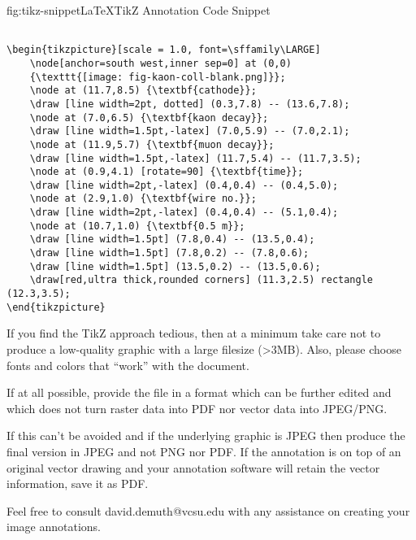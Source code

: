 \begin{dunefigure}{fig:tikz-snippet}{\LaTeX TikZ Annotation Code Snippet}
\begin{framed}
\begin{verbatim}

\begin{tikzpicture}[scale = 1.0, font=\sffamily\LARGE]
    \node[anchor=south west,inner sep=0] at (0,0) 
    {\texttt{[image: fig-kaon-coll-blank.png]}};
    \node at (11.7,8.5) {\textbf{cathode}};    
    \draw [line width=2pt, dotted] (0.3,7.8) -- (13.6,7.8);
    \node at (7.0,6.5) {\textbf{kaon decay}};    
    \draw [line width=1.5pt,-latex] (7.0,5.9) -- (7.0,2.1);
    \node at (11.9,5.7) {\textbf{muon decay}};    
    \draw [line width=1.5pt,-latex] (11.7,5.4) -- (11.7,3.5);
    \node at (0.9,4.1) [rotate=90] {\textbf{time}};
    \draw [line width=2pt,-latex] (0.4,0.4) -- (0.4,5.0);
    \node at (2.9,1.0) {\textbf{wire no.}};   
    \draw [line width=2pt,-latex] (0.4,0.4) -- (5.1,0.4);
    \node at (10.7,1.0) {\textbf{0.5 m}};    
    \draw [line width=1.5pt] (7.8,0.4) -- (13.5,0.4);
    \draw [line width=1.5pt] (7.8,0.2) -- (7.8,0.6);
    \draw [line width=1.5pt] (13.5,0.2) -- (13.5,0.6);    
    \draw[red,ultra thick,rounded corners] (11.3,2.5) rectangle (12.3,3.5);
\end{tikzpicture}

\end{verbatim}
\end{framed}
\end{dunefigure}

If you find the TikZ approach tedious, then at a minimum take care not to produce a 
low-quality graphic with a large filesize (>3MB). Also, please choose fonts and colors that ``work'' with the document.

If at all possible, provide the file in a format which can be further edited and which does not turn raster data into PDF nor vector data into JPEG/PNG.

If this can't be avoided and if the underlying graphic is JPEG then produce the final version in JPEG and not PNG nor PDF. If the annotation is on top of an original vector drawing and your annotation software will retain the vector information, save it as PDF.

Feel free to consult david.demuth@vcsu.edu with any assistance on creating your image annotations.
